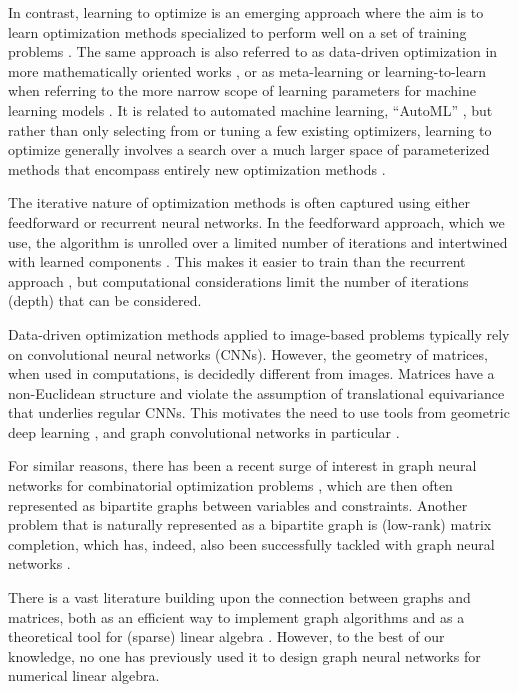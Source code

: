 \documentclass{article}
\begin{document}
In contrast, learning to optimize is an emerging approach where the aim is to learn optimization methods specialized to perform well on a set of training problems \citep{Chen2021}. The same approach is also referred to as data-driven optimization in more mathematically oriented works \citep{Banert2020}, or as meta-learning or learning-to-learn when referring to the more narrow scope of learning parameters for machine learning models \citep{Li2016,Andrychowicz2016,Bello2017}. It is related to automated machine learning, ``AutoML'' \citep{Hutter2019}, but rather than only selecting from or tuning a few existing optimizers, learning to optimize generally involves a search over a much larger space of parameterized methods that encompass entirely new optimization methods \citep{Maheswaranathan2020}.

The iterative nature of optimization methods is often captured using either feedforward or recurrent neural networks. In the feedforward approach, which we use, the algorithm is unrolled over a limited number of iterations and intertwined with learned components \citep{Gregor2010,Domke2012,Monga2021}. This makes it easier to train than the recurrent approach \citep{Andrychowicz2016,Venkataraman2021}, but computational considerations limit the number of iterations (depth) that can be considered.

Data-driven optimization methods applied to image-based problems \citep{Diamond2017,Banert2020} typically rely on convolutional neural networks (CNNs). However, the geometry of matrices, when used in computations, is decidedly different from images. Matrices have a non-Euclidean structure and violate the assumption of translational equivariance that underlies regular CNNs. This motivates the need to use tools from geometric deep learning \citep{Bronstein2017}, and graph convolutional networks in particular \citep{Kipf2016,Gilmer2017}.

For similar reasons, there has been a recent surge of interest in graph neural networks for combinatorial optimization problems \citep{Dai2017,Gasse2019,Nair2020,Cappart2021}, which are then often represented as bipartite graphs between variables and constraints. Another problem that is naturally represented as a bipartite graph is (low-rank) matrix completion, which has, indeed, also been successfully tackled with graph neural networks \citep{vanDenBerg2017, Monti2017}.

There is a vast literature building upon the connection between graphs and matrices, both as an efficient way to implement graph algorithms \citep{Kepner2011} and as a theoretical tool for (sparse) linear algebra \citep{Brualdi2008,Duff2017}. However, to the best of our knowledge, no one has previously used it to design graph neural networks for numerical linear algebra.
\end{document}
